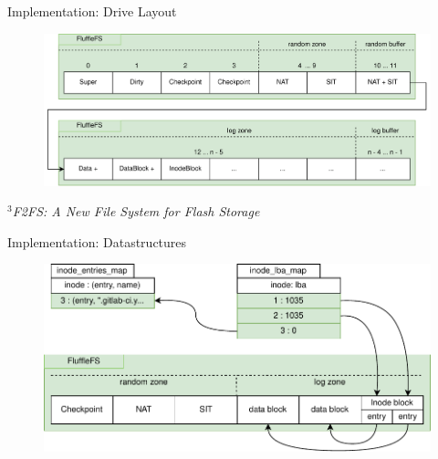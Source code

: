 \documentclass{beamer}
\begin{document}
\begin{frame}{Implementation: Drive Layout}
	\begingroup
	\small
	\begin{figure}[h]
		\centering
			  \includegraphics[width=1.0\linewidth]{resources/images/fluffle-layout-complete.png}
	\end{figure}
	\textit{\tiny $^{3}$F2FS: A New File System for Flash Storage}
	\endgroup
\end{frame}

\begin{frame}{Implementation: Datastructures}
	\begingroup
	\small
	\begin{figure}[h]
		\centering
			  \includegraphics[width=1.0\linewidth]{resources/images/fluffle-inode-sync.pdf}
	\end{figure}
	\endgroup
\end{frame}
\end{document}
